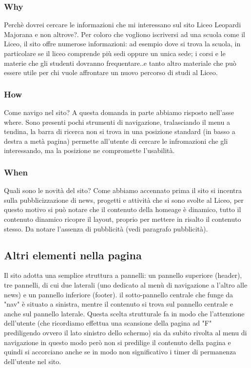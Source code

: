 \documentclass[12pt]{article}
\begin{document}
\subsubsection{Why} Perch\`e dovrei cercare le informazioni che mi interessano sul sito Liceo Leopardi Majorana e non altrove?. Per coloro che vogliono iscriversi ad una scuola come il Liceo, il sito offre numerose informazioni:
ad esempio dove si trova la scuola, in particolare se il liceo comprende pi\`u sedi oppure un unica sede; i corsi e le materie che gli studenti dovranno frequentare..e tanto altro materiale che pu\`o essere utile per chi vuole affrontare un nuovo percorso di studi al Liceo.
\subsubsection{How} Come navigo nel sito?
A questa domanda in parte abbiamo risposto nell'asse where.
Sono presenti pochi strumenti di navigazione, tralasciando il menu a tendina, la barra di ricerca non si trova in una posizione standard (in basso a destra a met\`a pagina) permette all'utente di cercare le infromazioni che gli interessando, ma la posizione ne compromette l'usabilit\`a.

\subsubsection{When} Quali sono le novit\`a del sito?
Come abbiamo accennato prima il sito si incentra sulla pubblicizzazione di news, progetti e attivit\`a che si sono svolte al Liceo, per questo motivo si pu\`o notare che il contenuto della homeage \`e dinamico, tutto il contenuto dinamico ricopre il layout, proprio per mettere in risalto il contenuto stesso. Da notare l'assenza di pubblicit\`a (vedi paragrafo pubblicit\`a).

\newpage
\subsection{Altri elementi nella pagina}
Il sito adotta una semplice struttura a pannelli: un pannello superiore (header), tre pannelli, di cui due laterali (uno dedicato al men\`u di navigazione a l'altro alle news) e un pannello inferiore (footer).  il sotto-pannello centrale che funge da "nav" \`e situato a sinistra, mentre il contenuto si trova sul pannello centrale e anche sul pannello laterale.
 Questa scelta strutturale fa in modo che l'attenzione dell'utente (che ricordiamo effettua una scansione della pagina ad "F" prediligendo ovvero il lato sinistro dello schermo) sia da subito rivolta al menu di navigazione in questo modo per\`o non si predilige il contenuto della pagina e quindi si accorciano anche se in modo non significativo i timer di permanenza dell'utente nel sito.
\end{document}
